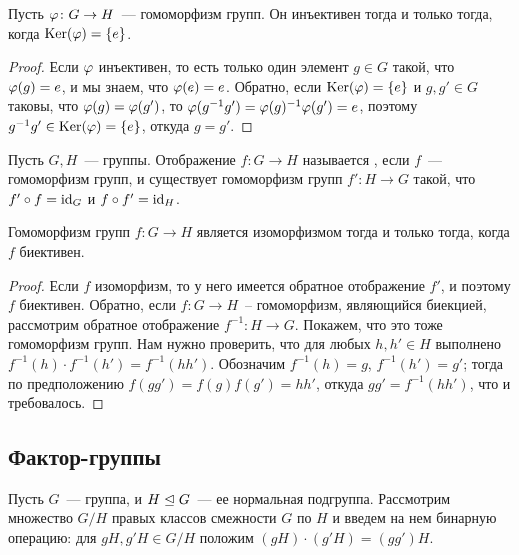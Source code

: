 \begin{lemma}\label{lem:injective_homo}
Пусть $\varphi\colon G\to H$~--- гомоморфизм групп. Он инъективен тогда и
только тогда, когда $\operatorname{Ker}(\varphi) = \{e\}$.
\end{lemma}
\begin{proof}
Если $\varphi$ инъективен, то есть только один элемент $g\in G$ такой, что
$\varphi(g) =e$, и мы знаем, что $\varphi(e)=e$.
Обратно, если $\operatorname{Ker}(\varphi)=\{e\}$ и $g,g'\in G$ таковы, что
$\varphi(g)=\varphi(g')$, то $\varphi(g^{-1}g') = \varphi(g)^{-1}\varphi(g') = e$, поэтому
$g^{-1}g'\in\operatorname{Ker}(\varphi)=\{e\}$, откуда $g = g'$.
\end{proof}

\begin{definition}
Пусть $G, H$~--- группы. Отображение $f\colon G\to H$ называется
, если $f$~--- гомоморфизм групп, и существует
гомоморфизм групп $f'\colon H\to G$ такой, что $f'\circ f = \operatorname{id}_G$ и
$f\circ f' = \operatorname{id}_H$.
\end{definition}

\begin{lemma}\label{lem:bijective_group_homo}
Гомоморфизм групп $f\colon G\to H$ является изоморфизмом тогда и
только тогда, когда $f$ биективен.
\end{lemma}
\begin{proof}
Если $f$ изоморфизм, то у него имеется обратное отображение $f'$, и
поэтому $f$ биективен. Обратно, если $f\colon G\to H$~-- гомоморфизм,
являющийся биекцией, рассмотрим обратное отображение
$f^{-1}\colon H\to G$. Покажем, что это тоже гомоморфизм групп. Нам
нужно проверить, что для любых $h,h'\in H$ выполнено $f^{-1}(h)\cdot
f^{-1}(h') = f^{-1}(hh')$.
Обозначим $f^{-1}(h) = g$, $f^{-1}(h') = g'$; тогда по предположению
$f(gg') = f(g)f(g') = hh'$, откуда $gg'= f^{-1}(hh')$, что и
требовалось.
\end{proof}


\subsection{Фактор-группы}


Пусть $G$~--- группа, и $H\trianglelefteq G$~--- ее нормальная
подгруппа. Рассмотрим множество $G/H$ правых классов смежности $G$ по
$H$ и введем на нем бинарную операцию: для $gH, g'H\in G/H$ положим
$(gH)\cdot (g'H) = (gg')H$.

